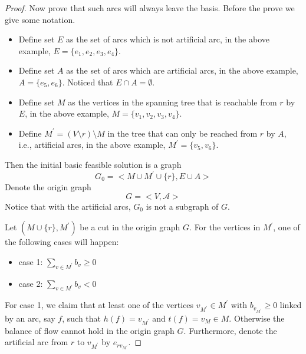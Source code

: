                 \begin{proof}
                    Now prove that such arcs will always leave the basis. Before the prove we give some notation. 
                    \begin{itemize}
                        \item Define set $E$ as the set of arcs which is not artificial arc, in the above example, $E = \{e_1, e_2, e_3, e_4\}$. 
                        \item Define set $A$ as the set of arcs which are artificial arcs, in the above example, $A = \{e_5, e_6\}$. Noticed that $E \cap A = \emptyset$.
                        \item Define set $M$ as the vertices in the spanning tree that is reachable from $r$ by $E$, in the above example, $M = \{v_1, v_2, v_3, v_4\}$.
                        \item Define $M^\prime = (V\setminus r) \setminus M$ in the tree that can only be reached from $r$ by $A$, i.e., artificial arcs, in the above example, $M^\prime = \{v_5, v_6\}$. 
                    \end{itemize}

                    Then the initial basic feasible solution is a graph 
                    \begin{equation*}
                        G_0 = <M\cup M^\prime \cup \{r\}, E\cup A>
                    \end{equation*}
                    Denote the origin graph 
                    \begin{equation*}
                        G = <V, \mathcal{A}>
                    \end{equation*}
                    Notice that with the artificial arcs, $G_0$ is not a subgraph of $G$.

                    Let $(M\cup\{r\}, M^\prime)$ be a cut in the origin graph $G$. For the vertices in $M^\prime$, one of the following cases will happen:
                    \begin{itemize}
                        \item case 1: $\sum_{v \in M^\prime} b_v \ge 0$
                        \item case 2: $\sum_{v \in M^\prime} b_v < 0$
                    \end{itemize}

                    For case 1, we claim that at least one of the vertices $v_{M^\prime} \in M^\prime$ with $b_{v_{M^\prime}} \ge 0$ linked by an arc, say $f$, such that $h(f) = v_{M^\prime}$ and $t(f) = v_M \in M$. Otherwise the balance of flow cannot hold in the origin graph $G$. Furthermore, denote the artificial arc from $r$ to $v_{M^\prime}$ by $e_{rv_{M^\prime}}$.


\end{proof}
